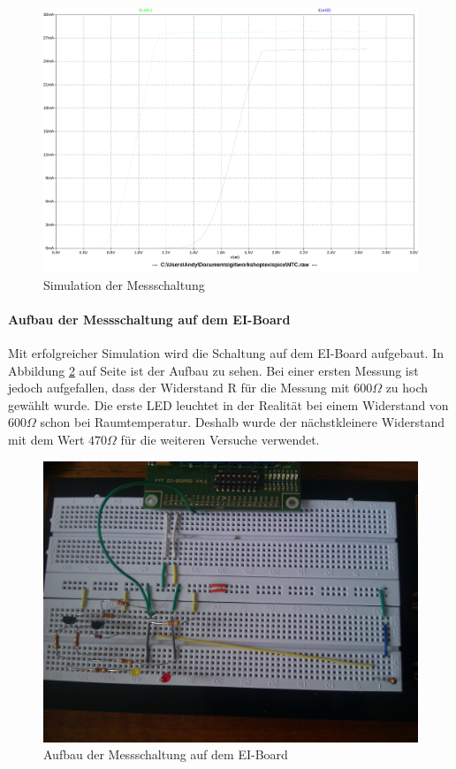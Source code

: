 \begin{figure}[h!]
	\centering
	\includegraphics[scale=0.4]{pics/NTC-Diagramm}
	\caption{Simulation der Messschaltung}
	\label{fig:ntc-simu}
\end{figure}

\paragraph{Aufbau der Messschaltung auf dem EI-Board}

Mit erfolgreicher Simulation wird die Schaltung auf dem EI-Board aufgebaut. In Abbildung \ref{fig:ntc-aufbau} auf Seite \pageref{fig:ntc-aufbau} ist der Aufbau zu sehen. Bei einer ersten Messung ist jedoch aufgefallen, dass der Widerstand R für die Messung mit \(600\Omega\) zu hoch gewählt wurde. Die erste LED leuchtet in der Realität bei einem Widerstand von \(600\Omega\) schon bei Raumtemperatur. Deshalb wurde der nächstkleinere Widerstand mit dem Wert \(470\Omega\) für die weiteren Versuche verwendet.\\

\begin{figure}[h!]
	\centering
	\includegraphics[scale=0.2]{pics/ntc-aufbau.jpg}
	\caption{Aufbau der Messschaltung auf dem EI-Board}
	\label{fig:ntc-aufbau}
\end{figure}

